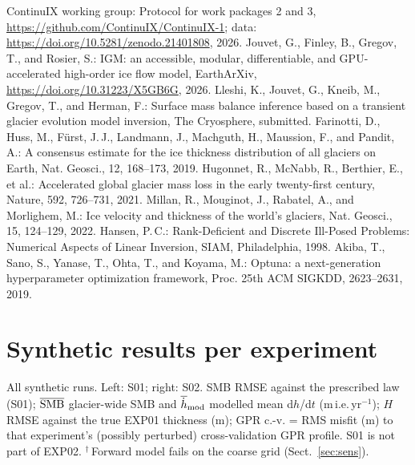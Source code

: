 \documentclass[10pt,a4paper]{article}
\newcommand{\mie}{m\,i.e.\,yr$^{-1}$}
\begin{document}
\begin{thebibliography}{99}\small
{} ContinuIX working group: Protocol for work packages 2 and 3, \url{https://github.com/ContinuIX/ContinuIX-1}; data: \url{https://doi.org/10.5281/zenodo.21401808}, 2026.
 Jouvet, G., Finley, B., Gregov, T., and Rosier, S.: IGM: an accessible, modular, differentiable, and GPU-accelerated high-order ice flow model, EarthArXiv, \url{https://doi.org/10.31223/X5GB6G}, 2026.
 Lleshi, K., Jouvet, G., Kneib, M., Gregov, T., and Herman, F.: Surface mass balance inference based on a transient glacier evolution model inversion, The Cryosphere, submitted.
 Farinotti, D., Huss, M., F\"urst, J.\,J., Landmann, J., Machguth, H., Maussion, F., and Pandit, A.: A consensus estimate for the ice thickness distribution of all glaciers on Earth, Nat. Geosci., 12, 168--173, 2019.
 Hugonnet, R., McNabb, R., Berthier, E., et al.: Accelerated global glacier mass loss in the early twenty-first century, Nature, 592, 726--731, 2021.
 Millan, R., Mouginot, J., Rabatel, A., and Morlighem, M.: Ice velocity and thickness of the world's glaciers, Nat. Geosci., 15, 124--129, 2022.
 Hansen, P.\,C.: Rank-Deficient and Discrete Ill-Posed Problems: Numerical Aspects of Linear Inversion, SIAM, Philadelphia, 1998.
 Akiba, T., Sano, S., Yanase, T., Ohta, T., and Koyama, M.: Optuna: a next-generation hyperparameter optimization framework, Proc. 25th ACM SIGKDD, 2623--2631, 2019.
\end{thebibliography}

\appendix
\section{Synthetic results per experiment}
\begin{table}[H]
\centering
\caption{All synthetic runs. Left: S01; right: S02. SMB RMSE against the prescribed law (S01); $\overline{\rm SMB}$
glacier-wide SMB and $\overline{\dot h}_{\rm mod}$ modelled mean d$h$/d$t$ (\mie); $H$ RMSE against the true EXP01
thickness (m); GPR c.-v. = RMS misfit (m) to that experiment's (possibly perturbed) cross-validation GPR profile. S01 is not part of
EXP02. $^\dagger$\,Forward model fails on the coarse grid (Sect.~\ref{sec:sens}).}
\label{tab:synall}
\resizebox{\textwidth}{!}{}
\end{table}
\end{document}
